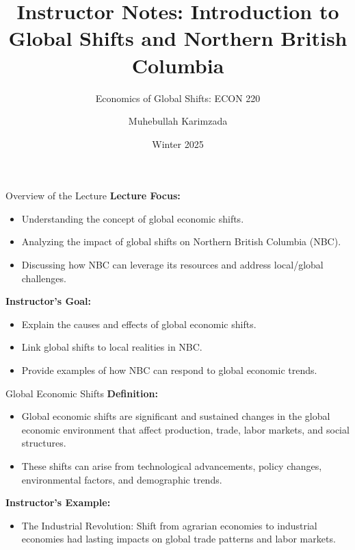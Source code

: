 \documentclass{beamer}
\title{Instructor Notes: Introduction to Global Shifts and Northern British Columbia}
\subtitle{Economics of Global Shifts: ECON 220}
\author{Muhebullah Karimzada}
\date{Winter 2025}
\begin{document}
\maketitle

\begin{frame}{Overview of the Lecture}
    \textbf{Lecture Focus:} 
    \begin{itemize}
        \item Understanding the concept of global economic shifts.
        \item Analyzing the impact of global shifts on Northern British Columbia (NBC).
        \item Discussing how NBC can leverage its resources and address local/global challenges.
    \end{itemize}
    \textbf{Instructor’s Goal:}
    \begin{itemize}
        \item Explain the causes and effects of global economic shifts.
        \item Link global shifts to local realities in NBC.
        \item Provide examples of how NBC can respond to global economic trends.
    \end{itemize}
\end{frame}

\begin{frame}{Global Economic Shifts}
    \textbf{Definition:}  
    \begin{itemize}
        \item Global economic shifts are significant and sustained changes in the global economic environment that affect production, trade, labor markets, and social structures.
        \item These shifts can arise from technological advancements, policy changes, environmental factors, and demographic trends.
    \end{itemize}
    \textbf{Instructor's Example:}
    \begin{itemize}
        \item The Industrial Revolution: Shift from agrarian economies to industrial economies had lasting impacts on global trade patterns and labor markets.
    \end{itemize}
\end{frame}
\end{document}
